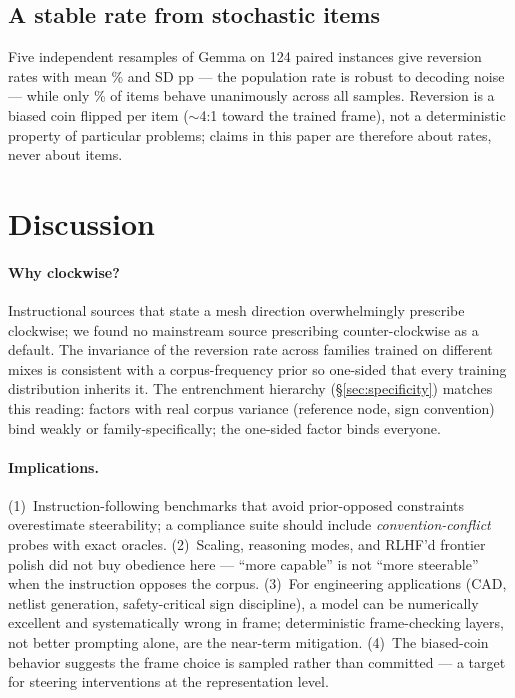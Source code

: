 \documentclass[11pt]{article}
\begin{document}
\subsection{A stable rate from stochastic items}
\label{sec:reliability}

Five independent resamples of Gemma on 124 paired instances give reversion
rates with mean \RetestMean\% and SD \RetestSD{}pp --- the population rate is
robust to decoding noise --- while only \RetestUnanimity\% of items behave
unanimously across all \RetestK{} samples. Reversion is a biased coin flipped
per item ($\sim$4:1 toward the trained frame), not a deterministic property
of particular problems; claims in this paper are therefore about rates, never
about items.

\section{Discussion}

\paragraph{Why clockwise?} Instructional sources that state a mesh direction
overwhelmingly prescribe clockwise; we found no mainstream source prescribing
counter-clockwise as a default. The invariance of the reversion rate across
families trained on different mixes is consistent with a corpus-frequency
prior so one-sided that every training distribution inherits it. The
entrenchment hierarchy (\S\ref{sec:specificity}) matches this reading:
factors with real corpus variance (reference node, sign convention) bind
weakly or family-specifically; the one-sided factor binds everyone.

\paragraph{Implications.} (1)~Instruction-following benchmarks that avoid
prior-opposed constraints overestimate steerability; a compliance suite
should include \emph{convention-conflict} probes with exact oracles.
(2)~Scaling, reasoning modes, and RLHF'd frontier polish did not buy
obedience here --- ``more capable'' is not ``more steerable'' when the
instruction opposes the corpus. (3)~For engineering applications (CAD,
netlist generation, safety-critical sign discipline), a model can be
numerically excellent and systematically wrong in frame; deterministic
frame-checking layers, not better prompting alone, are the near-term
mitigation. (4)~The biased-coin behavior suggests the frame choice is sampled
rather than committed --- a target for steering interventions at the
representation level.
\end{document}
